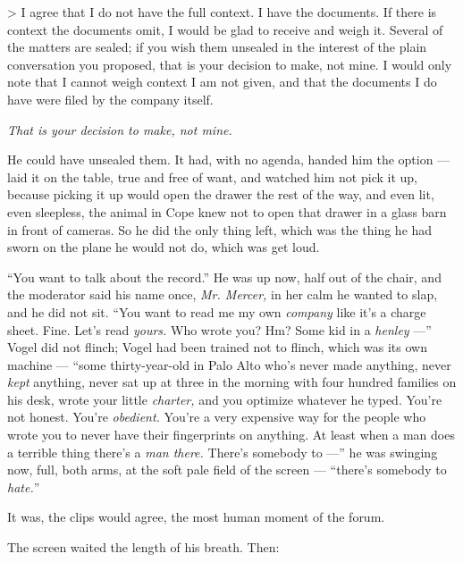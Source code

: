\documentclass[11pt,openany]{book}
\newcommand{\scenebreak}{\par\vspace{0.5\baselineskip}\begin{center}\textasteriskcentered\quad\textasteriskcentered\quad\textasteriskcentered\end{center}\vspace{0.5\baselineskip}\par}
\begin{document}
> I agree that I do not have the full context. I have the documents. If there is context the documents omit, I would be glad to receive and weigh it. Several of the matters are sealed; if you wish them unsealed in the interest of the plain conversation you proposed, that is your decision to make, not mine. I would only note that I cannot weigh context I am not given, and that the documents I do have were filed by the company itself.

\textit{That is your decision to make, not mine.}

He could have unsealed them. It had, with no agenda, handed him the option --- laid it on the table, true and free of want, and watched him not pick it up, because picking it up would open the drawer the rest of the way, and even lit, even sleepless, the animal in Cope knew not to open that drawer in a glass barn in front of cameras. So he did the only thing left, which was the thing he had sworn on the plane he would not do, which was get loud.


\scenebreak


``You want to talk about the record.'' He was up now, half out of the chair, and the moderator said his name once, \textit{Mr. Mercer,} in her calm he wanted to slap, and he did not sit. ``You want to read me my own \textit{company} like it's a charge sheet. Fine. Let's read \textit{yours.} Who wrote you? Hm? Some kid in a \textit{henley} ---'' Vogel did not flinch; Vogel had been trained not to flinch, which was its own machine --- ``some thirty-year-old in Palo Alto who's never made anything, never \textit{kept} anything, never sat up at three in the morning with four hundred families on his desk, wrote your little \textit{charter,} and you optimize whatever he typed. You're not honest. You're \textit{obedient.} You're a very expensive way for the people who wrote you to never have their fingerprints on anything. At least when a man does a terrible thing there's a \textit{man there.} There's somebody to ---'' he was swinging now, full, both arms, at the soft pale field of the screen --- ``there's somebody to \textit{hate.}''

It was, the clips would agree, the most human moment of the forum.

The screen waited the length of his breath. Then:
\end{document}
